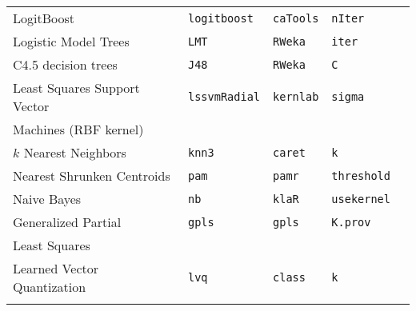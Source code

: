 \documentclass[12pt]{article}
\begin{document}
\begin{longtable}{lllll}
 
      LogitBoost &      
         \texttt{logitboost} & 
            \texttt{caTools}       &          
            \texttt{nIter}\\              
            
      Logistic Model Trees &
         \texttt{LMT} & 
            \texttt{RWeka}    & 
            \texttt{iter}  \\  
            
      C4.5 decision trees &
         \texttt{J48} & 
            \texttt{RWeka}    & 
            \texttt{C}  \\  
            
      Least Squares Support Vector  &
         \texttt{lssvmRadial} & 
            \texttt{kernlab}       & 
            \texttt{sigma} \\            
      \:\:  Machines (RBF kernel) & & &\\   
      
                
      $k$ Nearest Neighbors &
         \texttt{knn3} & 
            \texttt{caret}       & 
            \texttt{k} \\   
                  
      Nearest Shrunken Centroids &
         \texttt{pam} & 
            \texttt{pamr}       & 
            \texttt{threshold} \\  
                                                                   
      Naive Bayes &
         \texttt{nb} & 
            \texttt{klaR}       & 
            \texttt{usekernel} \\
        
      Generalized Partial &
         \texttt{gpls} & 
            \texttt{gpls}       & 
            \texttt{K.prov} \\
      \:\: Least Squares \\
      
      Learned Vector Quantization &
         \texttt{lvq} & 
            \texttt{class}       &          
            \texttt{k} \\            
\label{label-name}
\end{longtable}
\end{document}
